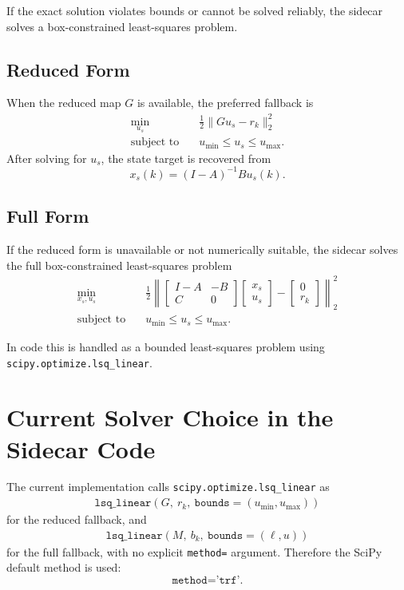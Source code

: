 \documentclass[11pt]{article}
\begin{document}
If the exact solution violates bounds or cannot be solved reliably, the sidecar solves a box-constrained least-squares problem.

\subsection{Reduced Form}

When the reduced map $G$ is available, the preferred fallback is
\begin{align}
\min_{u_s} \quad & \frac{1}{2}\| G u_s - r_k \|_2^2 \\
\text{subject to} \quad & u_{\min} \le u_s \le u_{\max}.
\end{align}
After solving for $u_s$, the state target is recovered from
\[
x_s(k) = (I-A)^{-1} B u_s(k).
\]

\subsection{Full Form}

If the reduced form is unavailable or not numerically suitable, the sidecar solves the full box-constrained least-squares problem
\begin{align}
\min_{x_s,u_s} \quad &
\frac{1}{2}\left\|
\begin{bmatrix}
I-A & -B \\
C & 0
\end{bmatrix}
\begin{bmatrix}
x_s \\
u_s
\end{bmatrix}
-
\begin{bmatrix}
0 \\
r_k
\end{bmatrix}
\right\|_2^2 \\
\text{subject to} \quad & u_{\min} \le u_s \le u_{\max}.
\end{align}

In code this is handled as a bounded least-squares problem using \texttt{scipy.optimize.lsq\_linear}.

\section{Current Solver Choice in the Sidecar Code}

The current implementation calls \texttt{scipy.optimize.lsq\_linear} as
\begin{align}
\texttt{lsq\_linear}(G,\ r_k,\ \texttt{bounds}=(u_{\min},u_{\max}))
\end{align}
for the reduced fallback, and
\begin{align}
\texttt{lsq\_linear}(M,\ b_k,\ \texttt{bounds}=(\ell, u))
\end{align}
for the full fallback, with no explicit \texttt{method=} argument. Therefore the SciPy default method is used:
\[
\texttt{method='trf'}.
\]
\end{document}
